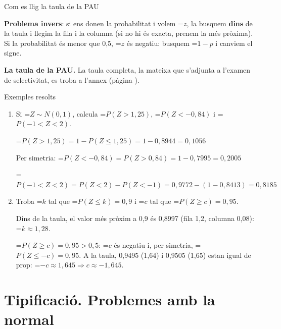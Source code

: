 \documentclass[11pt,a4paper]{article}
\newcommand{\lt}{<}\newcommand{\gt}{>}
\newcommand{\fmm}[1]{\setbox0=\hbox{$#1$}\ifdim\wd0>\linewidth\[#1\]\else\mbox{\box0}\fi}
\newcommand{\fmuline}[1]{\textbf{\color{fmaccent}#1}}
\begin{document}
\begin{fmdef}{Com es llig la taula de la PAU}
      
\begin{fmnote}\fmuline{Problema invers}: si ens donen la probabilitat i volem \fmm{z}, la busquem \textbf{dins} de la taula i llegim la fila i la columna (si no hi és exacta, prenem la més pròxima). Si la probabilitat és menor que 0,5, \fmm{z} és negatiu: busquem \fmm{1-p} i canviem el signe.\end{fmnote}
\end{fmdef}

  
\begin{fmnote}\textbf{La taula de la PAU.} La taula completa, la mateixa que s'adjunta a l'examen de selectivitat, es troba a l'annex (pàgina \pageref{tnorm}).\end{fmnote}

  
\begin{fmex}{Exemples resolts}
\begin{enumerate}[label=\textbf{\arabic*.},leftmargin=*]
\item Si \fmm{Z\sim N(0,1)}, calcula \fmm{P(Z\gt1{,}25)}, \fmm{P(Z\lt-0{,}84)} i \fmm{P(-1\lt Z\lt2)}.
          

            

\fmm{P(Z\gt1{,}25)=1-P(Z\leq1{,}25)=1-0{,}8944=0{,}1056}

            

Per simetria: \fmm{P(Z\lt-0{,}84)=P(Z\gt0{,}84)=1-0{,}7995=0{,}2005}

            

\fmm{P(-1\lt Z\lt2)=P(Z\lt2)-P(Z\lt-1)=0{,}9772-(1-0{,}8413)=0{,}8185}
\item Troba \fmm{k} tal que \fmm{P(Z\leq k)=0{,}9} i \fmm{c} tal que \fmm{P(Z\geq c)=0{,}95}.
          

            

Dins de la taula, el valor més pròxim a 0,9 és 0,8997 (fila 1,2, columna 0,08): \fmm{k\approx1{,}28}.

            

\fmm{P(Z\geq c)=0{,}95\gt0{,}5}: \fmm{c} és negatiu i, per simetria, \fmm{P(Z\leq-c)=0{,}95}. A la taula, 0,9495 (1,64) i 0,9505 (1,65) estan igual de prop: \fmm{-c\approx1{,}645\Rightarrow c\approx-1{,}645}.
\end{enumerate}
\end{fmex}

  
\section{Tipificació. Problemes amb la normal}\hypertarget{sec7}{}
\end{document}
